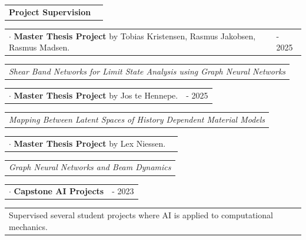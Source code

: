 \documentclass{cv}
\newcommand{\itemtitle}[2]{%
  \noindent\begin{tabular}{ m{11.7cm} m{4.0cm} }
  \hspace{-.4cm}
  #1 & \raggedleft #2
  \end{tabular}%
}
\newcommand{\itemdetails}[1]{%
  \begin{tabular}{ m{16.1cm} }
  #1
  \end{tabular}%
}
\begin{document}
\itemtitle{\textbf{Project Supervision}}{}

\vspace{0.07in}

\itemtitle{$\cdot$ \textbf{Master Thesis Project} by Tobias Kristensen, Rasmus Jakobsen, Rasmus Madsen.}{2024 - 2025}
\itemdetails{\textit{Shear Band Networks for Limit State Analysis using Graph Neural Networks}}

\vspace{0.04in}

\itemtitle{$\cdot$ \textbf{Master Thesis Project} by Jos te Hennepe.}{2024 - 2025}
\itemdetails{\textit{Mapping Between Latent Spaces of History Dependent Material Models}}

\vspace{0.04in}

\itemtitle{$\cdot$ \textbf{Master Thesis Project} by Lex Niessen.}{2022}
\itemdetails{\textit{Graph Neural Networks and Beam Dynamics}}

\vspace{0.04in}

\itemtitle{$\cdot$ \textbf{Capstone AI Projects}}{2021 - 2023}
\itemdetails{Supervised several student projects where AI is applied to computational mechanics.}

%
%
\end{document}
